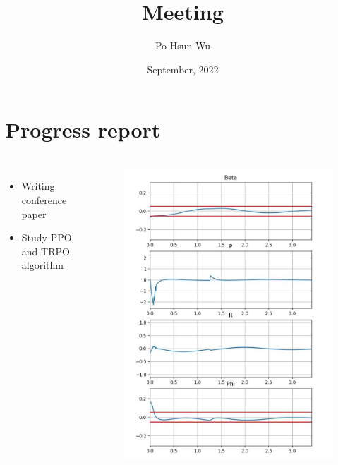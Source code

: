 \documentclass{beamer}
\date{September, 2022}
\title{Meeting}
\author{Po Hsun Wu}
\begin{document}
    \maketitle

    \section{Progress report}
    \begin{frame}
        \frametitle{\secname}

        \begin{columns}
            \begin{itemize}
                \itemsep 0em
                \item Writing conference paper
                \item Study PPO and TRPO algorithm
            \end{itemize}

            \begin{figure}
                \centering
                \includegraphics[scale=.3]{Figs/tamp.jpg}
            \end{figure}
        \end{columns}
    \end{frame}
\end{document}
